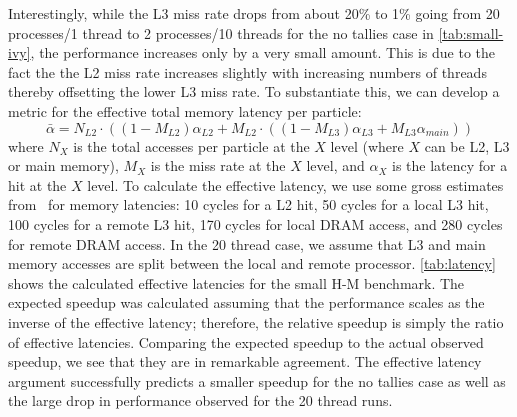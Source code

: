 \documentclass{mc2015}
\begin{document}
Interestingly, while the L3 miss rate drops from about 20\% to 1\% going from
20 processes/1 thread to 2 processes/10 threads for the no tallies case in
\autoref{tab:small-ivy}, the performance increases only by a very small
amount. This is due to the fact the the L2 miss rate increases slightly with
increasing numbers of threads thereby offsetting the lower L3 miss rate. To
substantiate this, we can develop a metric for the effective total memory
latency per particle:
\begin{equation}
  \bar{\alpha} = N_{L2}\cdot \left ( (1-M_{L2})\alpha_{L2} + M_{L2}\cdot((1 -
  M_{L3})\alpha_{L3} + M_{L3} \alpha_{main}) \right )
\end{equation}
where $N_X$ is the total accesses per particle at the $X$ level (where $X$ can
be L2, L3 or main memory), $M_X$ is the miss rate at the $X$ level, and
$\alpha_X$ is the latency for a hit at the $X$ level. To calculate the effective
latency, we use some gross estimates from~\cite{intel} for memory latencies: 10
cycles for a L2 hit, 50 cycles for a local L3 hit, 100 cycles for a remote L3
hit, 170 cycles for local DRAM access, and 280 cycles for remote DRAM access. In
the 20 thread case, we assume that L3 and main memory accesses are split between
the local and remote processor. \autoref{tab:latency} shows the calculated
effective latencies for the small H-M benchmark. The expected speedup was
calculated assuming that the performance scales as the inverse of the effective
latency; therefore, the relative speedup is simply the ratio of effective
latencies. Comparing the expected speedup to the actual observed speedup, we see
that they are in remarkable agreement. The effective latency argument
successfully predicts a smaller speedup for the no tallies case as well as the
large drop in performance observed for the 20 thread runs.
\end{document}
